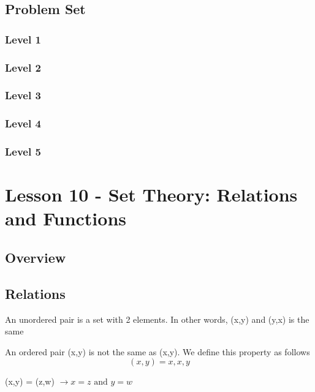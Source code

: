\documentclass{article}
\begin{document}
\subsection{Problem Set}
\subsubsection{Level 1}
\subsubsection{Level 2}
\subsubsection{Level 3}
\subsubsection{Level 4}
\subsubsection{Level 5}
\pagebreak

\section{Lesson 10 - Set Theory: Relations and Functions}
\subsection{Overview}
\subsection{Relations}

\begin{definition}
    An unordered pair is a set with 2 elements. In other words, (x,y)
    and (y,x) is the same
\end{definition}

\begin{definition}
    An ordered pair (x,y) is not the same as (x,y). We define this property
    as follows $$ (x,y) = {{x}, {x,y}} $$
\end{definition}

\begin{remark}

\end{remark}

\begin{theorem}
    (x,y) = (z,w) $\longrightarrow x=z \text{ and } y=w$
\end{theorem}
\end{document}
